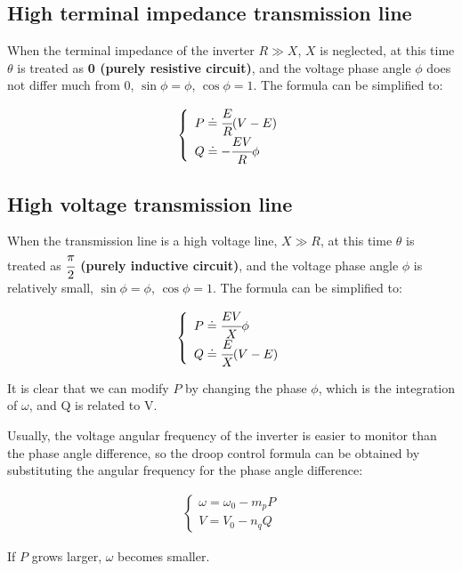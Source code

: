 \subsection*{High terminal impedance transmission line}

When the terminal impedance of the inverter $R \gg X$, $X$ is neglected, at this time $\theta$ is treated as \textbf{0 (purely resistive circuit)}, and the voltage phase angle $\phi$ does not differ much from 0, $\sin{\phi}=\phi$, $\cos{\phi}=1$. The formula can be simplified to:

\begin{equation}
\begin{aligned}
\left\{\begin{array}{l}
    P \doteq \cfrac{E}{R}(V-E)    \\
    Q \doteq -\cfrac{EV}{R}\phi
\end{array}\right.
\end{aligned}
\end{equation}

\subsection*{High voltage transmission line}

When the transmission line is a high voltage line, $X \gg R$, at this time $\theta$ is treated as \textbf{$\cfrac{\pi}{2}$ (purely inductive circuit)}, and the voltage phase angle $\phi$ is relatively small, $\sin{\phi}=\phi$, $\cos{\phi}=1$. The formula can be simplified to:

\begin{equation}
\begin{aligned}
\left\{\begin{array}{l}
    P \doteq \cfrac{EV}{X}\phi    \\
    Q \doteq \cfrac{E}{X}(V-E)
\end{array}\right.
\end{aligned}
\end{equation}

It is clear that we can modify $P$ by changing the phase $\phi$, which is the integration of $\omega$, and Q is related to V.

Usually, the voltage angular frequency of the inverter is easier to monitor than the phase angle difference, so the droop control formula can be obtained by substituting the angular frequency for the phase angle difference:

\begin{equation}
\begin{aligned}
\left\{\begin{array}{l}
    \omega = \omega_0-m_pP    \\
    V = V_0 - n_qQ
\end{array}\right.
\end{aligned}
\end{equation}

If $P$ grows larger, $\omega$ becomes smaller.


